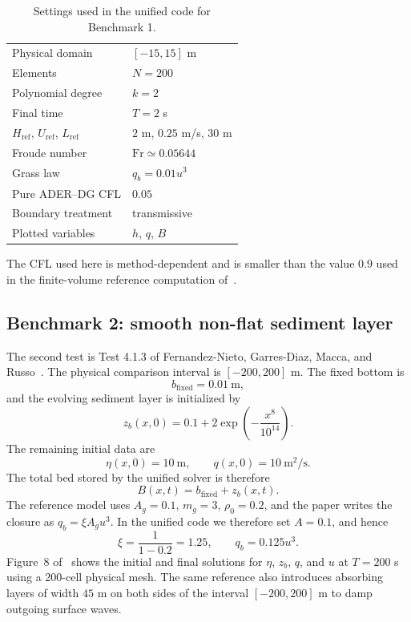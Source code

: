 \documentclass[11pt]{article}
\newcommand{\Fr}{\mathrm{Fr}}
\begin{document}
\begin{table}[h]
\centering
\caption{Settings used in the unified code for Benchmark 1.}
\label{tab:benchmark1}
\begin{tabular}{ll}
\toprule
Physical domain & $[-15,15]$ m \\
Elements & $N=200$ \\
Polynomial degree & $k=2$ \\
Final time & $T=2$ s \\
$H_{\mathrm{ref}}$, $U_{\mathrm{ref}}$, $L_{\mathrm{ref}}$ & $2$ m, $0.25$ m/s, $30$ m \\
Froude number & $\Fr\simeq 0.05644$ \\
Grass law & $q_b=0.01u^3$ \\
Pure ADER--DG CFL & $0.05$ \\
Boundary treatment & transmissive \\
Plotted variables & $h$, $q$, $B$ \\
\bottomrule
\end{tabular}
\end{table}

The CFL used here is method-dependent and is smaller than the value $0.9$ used in the finite-volume reference computation of~\cite{siviglia2022}.

\subsection{Benchmark 2: smooth non-flat sediment layer}

The second test is Test 4.1.3 of Fernandez-Nieto, Garres-Diaz, Macca, and Russo~\cite{fernandeznieto2025}. The physical comparison interval is $[-200,200]$ m. The fixed bottom is
\[
    b_{\mathrm{fixed}}=0.01\ \mathrm{m},
\]
and the evolving sediment layer is initialized by
\begin{equation}
    z_b(x,0)=0.1+2\exp\!\left(-\frac{x^8}{10^{14}}\right).
    \label{eq:smooth-bed}
\end{equation}
The remaining initial data are
\begin{equation}
    \eta(x,0)=10\ \mathrm{m},
    \qquad
    q(x,0)=10\ \mathrm{m^2/s}.
    \label{eq:smooth-data}
\end{equation}
The total bed stored by the unified solver is therefore
\[
    B(x,t)=b_{\mathrm{fixed}}+z_b(x,t).
\]
The reference model uses $A_g=0.1$, $m_g=3$, $\rho_0=0.2$, and the paper writes the closure as $q_b=\xi A_g u^3$. In the unified code we therefore set $A=0.1$, and hence
\[
    \xi=\frac{1}{1-0.2}=1.25,
    \qquad
    q_b=0.125u^3.
\]
Figure~8 of~\cite{fernandeznieto2025} shows the initial and final solutions for $\eta$, $z_b$, $q$, and $u$ at $T=200$ s using a 200-cell physical mesh. The same reference also introduces absorbing layers of width $45$ m on both sides of the interval $[-200,200]$ m to damp outgoing surface waves.
\end{document}
